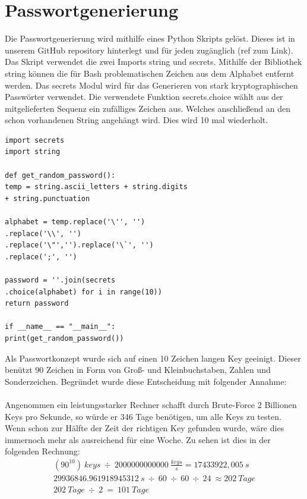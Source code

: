 \documentclass[a4paper,11pt,singlespacing]{article}
\begin{document}
                
            
    	\section{Passwortgenerierung}
    		Die Passwortgenerierung wird mithilfe eines Python Skripts gelöst. Dieses ist in unserem GitHub repository hinterlegt und für jeden zugänglich (ref zum Link). Das Skript verwendet die zwei Imports string und secrets. Mithilfe der Bibliothek string können die für Bash problematischen Zeichen aus dem Alphabet entfernt werden. Das secrets Modul wird für das Generieren von stark kryptographischen Passwörter verwendet. Die verwendete Funktion secrets.choice wählt aus der mitgelieferten Sequenz ein zufälliges Zeichen aus. Welches anschließend an den schon vorhandenen String angehängt wird. Dies wird 10 mal wiederholt.
    	
    	\lstset{
    			basicstyle=\ttfamily,
    			language=Python,
    		}
    	

            \begin{lstlisting}
import secrets
import string

def get_random_password():
temp = string.ascii_letters + string.digits 
+ string.punctuation

alphabet = temp.replace('\'', '')
.replace('\\', '')
.replace('\"','').replace('\`', '')
.replace(';', '')

password = ''.join(secrets
.choice(alphabet) for i in range(10))
return password

if __name__ == "__main__":
print(get_random_password())
            \end{lstlisting}
    	
    	    	Als Passwortkonzept wurde sich auf einen 10 Zeichen langen Key geeinigt. Dieser benützt 90 Zeichen in Form von Groß- und Kleinbuchstaben, Zahlen und Sonderzeichen. Begründet wurde diese Entscheidung mit folgender Annahme: \\\\
		Angenommen ein leistungsstarker Rechner schafft durch Brute-Force 2 Billionen Keys pro Sekunde, so würde er 346 Tage benötigen, um alle Keys zu testen.  Wenn schon zur Hälfte der Zeit der richtigen Key gefunden wurde, wäre dies immernoch mehr als ausreichend für eine Woche. Zu sehen ist dies in der folgenden Rechnung:
		\begin{eqnarray}
			(90^{10})\ keys\ \div\ 2000000000000\ \frac{keys}{s} =  17433922,005\ s\\
			29936846.961918945312\ s\ \div\ 60\ \div\ 60\ \div\ 24\ \approx 202 \ Tage\\
			202\ Tage\ \div\ 2\ =\ 101\ Tage
		\end{eqnarray}\\
\end{document}
